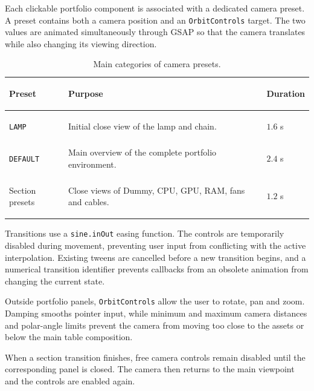 \documentclass{report}
\begin{document}
Each clickable portfolio component is associated with a dedicated camera
preset. A preset contains both a camera position and an
\texttt{OrbitControls} target. The two values are animated
simultaneously through GSAP so that the camera translates while also
changing its viewing direction.

\begin{table}[ht]
    \centering
    \small
    \setlength{\tabcolsep}{7pt}
    \renewcommand{\arraystretch}{1.2}

    \begin{tabularx}{\textwidth}{
        @{}
        >{\bfseries\raggedright\arraybackslash}p{}
        >{\raggedright\arraybackslash}X
        >{\centering\arraybackslash}p{}
        @{}
    }
        \toprule
        Preset & Purpose & Duration \\
        \midrule

        \texttt{LAMP}
        &
        Initial close view of the lamp and chain.
        &
        \(1.6\) s
        \\

        \texttt{DEFAULT}
        &
        Main overview of the complete portfolio environment.
        &
        \(2.4\) s
        \\

        Section presets
        &
        Close views of Dummy, CPU, GPU, RAM, fans and cables.
        &
        \(1.2\) s
        \\

        \bottomrule
    \end{tabularx}

    \caption{Main categories of camera presets.}
    \label{tab:camera-preset-types}
\end{table}

Transitions use a \texttt{sine.inOut} easing function. The controls are
temporarily disabled during movement, preventing user input from
conflicting with the active interpolation. Existing tweens are cancelled
before a new transition begins, and a numerical transition identifier
prevents callbacks from an obsolete animation from changing the current
state.

Outside portfolio panels, \texttt{OrbitControls} allow the user to
rotate, pan and zoom. Damping smooths pointer input, while minimum and
maximum camera distances and polar-angle limits prevent the camera from
moving too close to the assets or below the main table composition.

When a section transition finishes, free camera controls remain disabled
until the corresponding panel is closed. The camera then returns to the
main viewpoint and the controls are enabled again.
\end{document}
